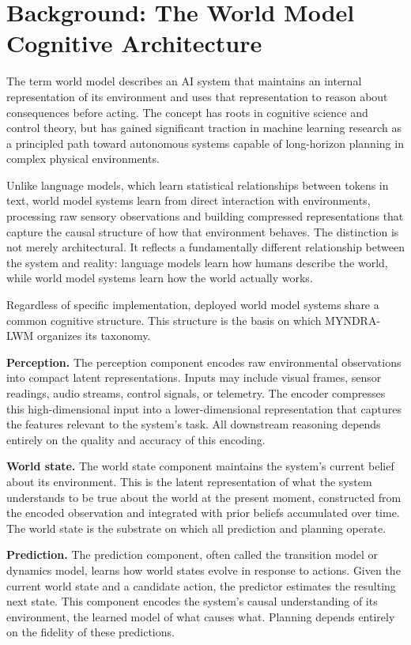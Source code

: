 \documentclass[11pt,a4paper]{article}
\begin{document}
\section{Background: The World Model Cognitive Architecture}

The term world model describes an AI system that maintains an internal representation of its environment and uses that representation to reason about consequences before acting. The concept has roots in cognitive science and control theory, but has gained significant traction in machine learning research as a principled path toward autonomous systems capable of long-horizon planning in complex physical environments.

Unlike language models, which learn statistical relationships between tokens in text, world model systems learn from direct interaction with environments, processing raw sensory observations and building compressed representations that capture the causal structure of how that environment behaves. The distinction is not merely architectural. It reflects a fundamentally different relationship between the system and reality: language models learn how humans describe the world, while world model systems learn how the world actually works.

Regardless of specific implementation, deployed world model systems share a common cognitive structure. This structure is the basis on which MYNDRA-LWM organizes its taxonomy.

\textbf{Perception.} The perception component encodes raw environmental observations into compact latent representations. Inputs may include visual frames, sensor readings, audio streams, control signals, or telemetry. The encoder compresses this high-dimensional input into a lower-dimensional representation that captures the features relevant to the system's task. All downstream reasoning depends entirely on the quality and accuracy of this encoding.

\textbf{World state.} The world state component maintains the system's current belief about its environment. This is the latent representation of what the system understands to be true about the world at the present moment, constructed from the encoded observation and integrated with prior beliefs accumulated over time. The world state is the substrate on which all prediction and planning operate.

\textbf{Prediction.} The prediction component, often called the transition model or dynamics model, learns how world states evolve in response to actions. Given the current world state and a candidate action, the predictor estimates the resulting next state. This component encodes the system's causal understanding of its environment, the learned model of what causes what. Planning depends entirely on the fidelity of these predictions.
\end{document}
